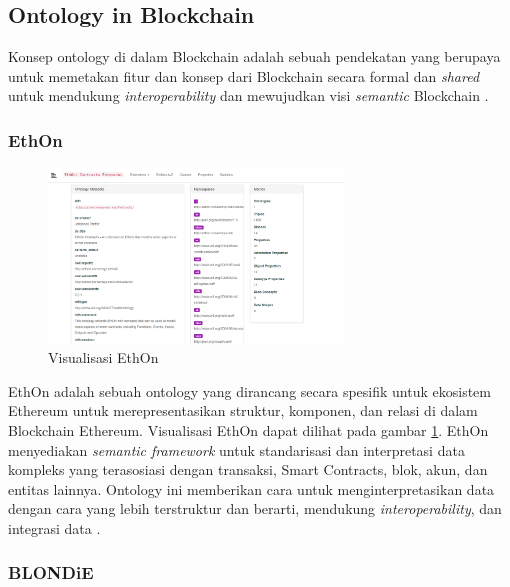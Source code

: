 \subsection{Ontology in Blockchain}
\label{subsec:ontology-in-blockchain}

Konsep ontology di dalam Blockchain adalah sebuah pendekatan yang berupaya untuk memetakan fitur dan konsep dari Blockchain secara formal dan \textit{shared} untuk mendukung \textit{interoperability} \parencite{9770809} dan mewujudkan visi \textit{semantic} Blockchain \parencite{hector2020blondie}.

\subsubsection{EthOn}
\label{subsubsec:ethon}

\begin{figure}[ht]
	\centering
	\includegraphics[width=0.7\textwidth]{resources/chapter-2/ethon.png}
	\caption{Visualisasi EthOn \parencite{ethon2024}}
	\label{image:ethon}
\end{figure}

EthOn adalah sebuah ontology yang dirancang secara spesifik untuk ekosistem Ethereum untuk merepresentasikan struktur, komponen, dan relasi di dalam Blockchain Ethereum. Visualisasi EthOn dapat dilihat pada gambar \ref{image:ethon}. EthOn menyediakan \textit{semantic framework} untuk standarisasi dan interpretasi data kompleks yang terasosiasi dengan transaksi, Smart Contracts, blok, akun, dan entitas lainnya. Ontology ini memberikan cara untuk menginterpretasikan data dengan cara yang lebih terstruktur dan berarti, mendukung \textit{interoperability}, dan integrasi data \parencite{pfeffer2016ethon}.

\subsubsection{BLONDiE}
\label{subsubsec:blondie}

